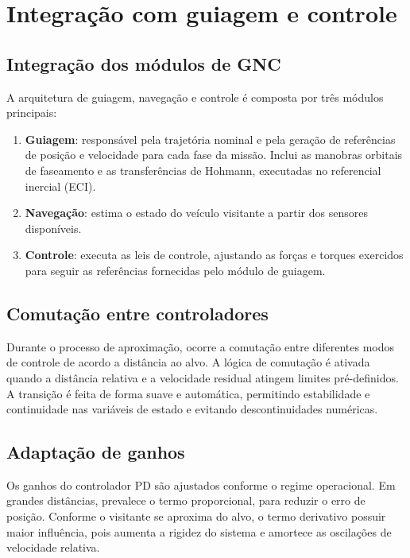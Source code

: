 \section{Integração com guiagem e controle}
\label{sec:integracao_guiagem_controle}

\subsection{Integração dos módulos de GNC}

A arquitetura de guiagem, navegação e controle é composta por três módulos principais:

\begin{enumerate}[label=(\roman*), leftmargin=*, itemsep=0pt]
    \item \textbf{Guiagem}: responsável pela trajetória nominal e pela geração de referências de posição e velocidade para cada fase da missão. Inclui as manobras orbitais de faseamento e as transferências de Hohmann, executadas no referencial inercial (ECI).
    \item \textbf{Navegação}: estima o estado do veículo visitante a partir dos sensores disponíveis.
    \item \textbf{Controle}: executa as leis de controle, ajustando as forças e torques exercidos para seguir as referências fornecidas pelo módulo de guiagem.
\end{enumerate}

\subsection{Comutação entre controladores}

Durante o processo de aproximação, ocorre a comutação entre diferentes modos de controle de acordo a distância ao alvo.
A lógica de comutação é ativada quando a distância relativa e a velocidade residual atingem limites pré-definidos.
A transição é feita de forma suave e automática, permitindo estabilidade e continuidade nas variáveis de estado e evitando descontinuidades numéricas.

\subsection{Adaptação de ganhos}

Os ganhos do controlador PD são ajustados conforme o regime operacional.
Em grandes distâncias, prevalece o termo proporcional, para reduzir o erro  de posição.
Conforme o visitante se aproxima do alvo, o termo derivativo possuir maior influência, pois aumenta a rigidez do sistema e amortece as oscilações de velocidade relativa.

